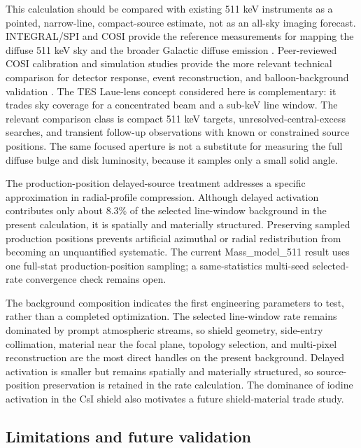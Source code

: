 \documentclass[11pt]{article}
\begin{document}
This calculation should be compared with existing 511 keV instruments as a pointed, narrow-line, compact-source estimate, not as an all-sky imaging forecast. INTEGRAL/SPI and COSI provide the reference measurements for mapping the diffuse 511 keV sky and the broader Galactic diffuse emission \cite{Siegert2016AA,Kierans2020,Siegert2020COSI,Yoneda2025,Karwin2023}. Peer-reviewed COSI calibration and simulation studies provide the more relevant technical comparison for detector response, event reconstruction, and balloon-background validation \cite{Beechert2022,Sleator2019,Gallego2025Balloon,Gallego2025,Ciabattoni2025ACS}. The TES Laue-lens concept considered here is complementary: it trades sky coverage for a concentrated beam and a sub-keV line window. The relevant comparison class is compact 511 keV targets, unresolved-central-excess searches, and transient follow-up observations with known or constrained source positions. The same focused aperture is not a substitute for measuring the full diffuse bulge and disk luminosity, because it samples only a small solid angle.

The production-position delayed-source treatment addresses a specific approximation in radial-profile compression. Although delayed activation contributes only about 8.3\% of the selected line-window background in the present calculation, it is spatially and materially structured. Preserving sampled production positions prevents artificial azimuthal or radial redistribution from becoming an unquantified systematic. The current Mass\_model\_511 result uses one full-stat production-position sampling; a same-statistics multi-seed selected-rate convergence check remains open.

The background composition indicates the first engineering parameters to test, rather than a completed optimization. The selected line-window rate remains dominated by prompt atmospheric streams, so shield geometry, side-entry collimation, material near the focal plane, topology selection, and multi-pixel reconstruction are the most direct handles on the present background. Delayed activation is smaller but remains spatially and materially structured, so source-position preservation is retained in the rate calculation. The dominance of iodine activation in the CsI shield also motivates a future shield-material trade study.

\subsection{Limitations and future validation}
\label{subsec:limitations}
\end{document}
